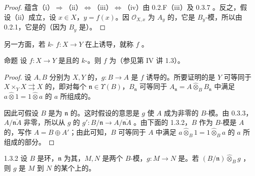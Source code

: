 \begin{proof}
蕴含（i）$\Rightarrow$（ii）$\Leftrightarrow$（iii）$\Leftrightarrow$（iv）由 0.2.F（iii）及 0.3.7 。反之，假设（ii）成立，设 $x\in X$，$y=f(x)$。因 $\mathcal O_{X,x}$ 为 $A_y$ 的，它是 $B_y$-模，所以由 0.2.1，它是的（因为 $B_y$ 是）。
\end{proof}
另一方面，若 $k$- $f:X\to Y$ 在上诱导，就称 $f$ 。
\begin{SGAresult}{命题}{}
设 $f:X\to Y$ 是且的 $k$-。则 $f$ 为（参见第 IV 讲 1.3）。
\end{SGAresult}
\begin{proof}
设 $A,B$ 分别为 $X,Y$ 的，$g:B\to A$ 是 $f$ 诱导的。所要证明的是 $Y$ 可等同于 $X\times_Y X\rightrightarrows X$ 的，即对每个 $\mathfrak n\in\Upsilon(B)$，$B_{\mathfrak n}$ 可等同于 $A_{\mathfrak n}=A\widehat\otimes_B B_{\mathfrak n}$ 中满足 $a\widehat\otimes1=1\widehat\otimes a$ 的 $a$ 所组成的。

因此可假设 $B$ 是为 $\mathfrak n$ 的。这时假设的意思是 $g$ 使 $A$ 成为非零的 $B$-模。由  0.3.3，$A/\overline{\mathfrak nA}$ 非零，所以从 $g$ 的 $g':B/\mathfrak n\to A/\overline{\mathfrak nA}$ 。由下面的 1.3.2，$B$ 作为 $B$-模是 $A$ 的，写作 $A=B\oplus A'$；由此可知，$B$ 可等同于 $A$ 中满足 $a\widehat\otimes_B1=1\widehat\otimes_Ba$ 的 $a$ 所组成的部分。
\end{proof}
\begin{SGAresult}{}{1.3.2}
设 $B$ 是环，$\mathfrak n$ 为其，$M,N$ 是两个 $B$-模，$g:M\to N$ 是。若 $(B/\mathfrak n)\widehat\otimes_Bg$ ，则 $g$ 是 $M$ 到 $N$ 的某个上的。
\end{SGAresult}
